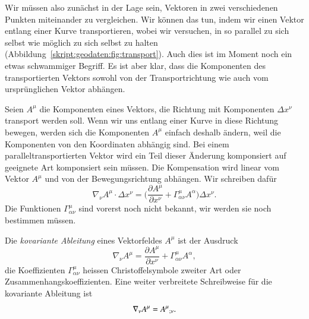 Wir müssen also zunächst in der Lage sein, Vektoren in zwei verschiedenen
Punkten miteinander zu vergleichen.
Wir können das tun, indem wir einen Vektor entlang einer Kurve transportieren,
wobei wir versuchen, in so parallel zu sich selbst wie möglich zu sich
selbst zu halten (Abbildung~\ref{skript:geodaten:fig:transport}).
Auch dies ist im Moment noch ein etwas schwammiger Begriff. 
Es ist aber klar, dass die Komponenten des transportierten Vektors
sowohl von der Transportrichtung wie auch vom ursprünglichen Vektor
abhängen.

Seien $A^\mu$ die Komponenten eines Vektors, die Richtung mit Komponenten
$\Delta x^\nu$ transport werden soll.
Wenn wir uns entlang einer Kurve in diese Richtung bewegen, werden sich
die Komponenten $A^\mu$ einfach deshalb ändern, weil die Komponenten von
den Koordinaten abhängig sind.
Bei einem paralleltransportierten Vektor wird ein Teil dieser Änderung
komponsiert auf geeignete Art komponsiert sein müssen.
Die Kompensation wird linear vom Vektor $A^\mu$ und von der
Bewegungsrichtung abhängen.
Wir schreiben dafür
\[
\nabla_\nu A^\mu\cdot \Delta x^\nu
=
\biggl(\frac{\partial A^\mu}{\partial x^\nu}
+
\Gamma^\mu_{\alpha\nu}A^\alpha\biggr)\Delta x^\nu.
\]
Die Funktionen $\Gamma^\mu_{\alpha\nu}$ sind vorerst noch nicht bekannt,
wir werden sie noch bestimmen müssen.

\begin{definition}
Die {\em kovariante Ableitung} eines Vektorfeldes $A^\mu$ ist der 
Ausdruck
\begin{equation}
\nabla_\nu A^\mu
=
\frac{\partial A^\mu}{\partial x^\nu}
+
\Gamma^\mu_{\alpha\nu}A^\alpha,
\label{skript:geodaeten:kovarianteableitung}
\end{equation}
die Koeffizienten $\Gamma^\mu_{\alpha\nu}$ heissen Christoffelsymbole
zweiter Art oder Zusammenhangskoeffizienten.
Eine weiter verbreitete Schreibweise für die kovariante Ableitung
ist
\[
\nabla_\nu A^\mu
=
A^\mu\mathstrut_{;\nu}.
\]
\end{definition}

